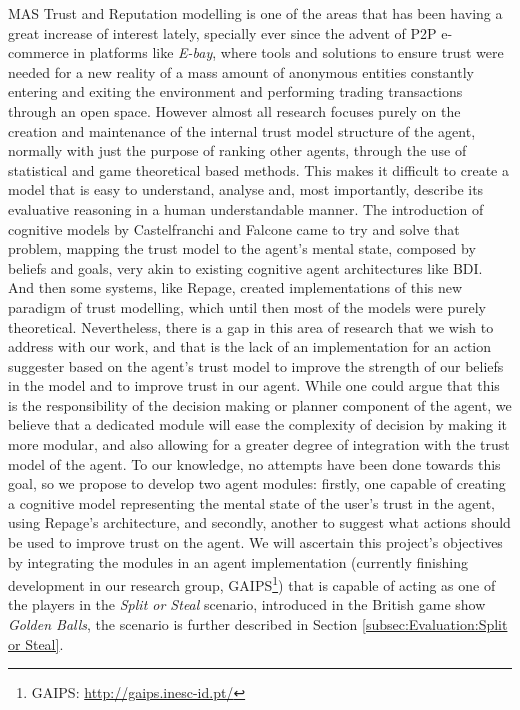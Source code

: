 \ac{MAS} Trust and Reputation modelling is one of the areas that has been having a great increase of interest lately, specially ever since the advent of \ac{P2P} e-commerce in platforms like \textit{E-bay}\cite{eBay2002}, where tools and solutions to ensure trust were needed for a new reality of a mass amount of anonymous entities constantly entering and exiting the environment and performing trading transactions through an open space. However almost all research focuses purely on the creation and maintenance of the internal trust model structure of the agent, normally with just the purpose of ranking other agents, through the use of statistical and game theoretical based methods. This makes it difficult to create a model that is easy to understand, analyse and, most importantly, describe its evaluative reasoning in a human understandable manner. The introduction of cognitive models by Castelfranchi and Falcone \cite{Castelfranchi1998} came to try and solve that problem, mapping the trust model to the agent's mental state, composed by beliefs and goals, very akin to existing cognitive agent architectures like BDI\cite{Rao1995}. And then some systems, like Repage\cite{Sabater2006}, created implementations of this new paradigm of trust modelling, which until then most of the models were purely theoretical. Nevertheless, there is a gap in this area of research that we wish to address with our work, and that is the lack of an implementation for an action suggester based on the agent's trust model to improve the strength of our beliefs in the model and to improve trust in our agent. While one could argue that this is the responsibility of the decision making or planner component of the agent, we believe that a dedicated module will ease the complexity of decision by making it more modular, and also allowing for a greater degree of integration with the trust model of the agent. To our knowledge, no attempts have been done towards this goal, so we propose to develop two agent modules: firstly, one capable of creating a cognitive model representing the mental state of the user's trust in the agent, using Repage's architecture, and secondly, another to suggest what actions should be used to improve trust on the agent. We will ascertain this project's objectives by integrating the modules in an agent implementation (currently finishing development in our research group, \acs{GAIPS}\footnote{\ac{GAIPS}: \url{http://gaips.inesc-id.pt/}}) that is capable of acting as one of the players in the \textit{Split or Steal} scenario, introduced in the British game show \textit{Golden Balls}\cite{Wikipedia.Golden.Balls}, the scenario is further described in Section \ref{subsec:Evaluation:Split or Steal}. 

